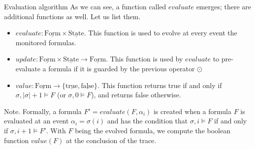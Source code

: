 \documentclass[aspectratio=169,t,xcolor=table]{beamer}
\begin{document}
\begin{frame}[allowframebreaks]{Evaluation algorithm}
    As we can see, a function called $evaluate$ emerges; there are additional functions as well. Let us list them.
    \begin{itemize}
        \item $evaluate: \underline{\text{Form}} \times \underline{\text{State}}$. This function is used to evolve at every event the monitored formulas.
        \item $update: \underline{\text{Form}} \times \underline{\text{State}} \to \underline{\text{Form}}$. This function is used by $evaluate$ to pre-evaluate a formula if it is guarded by the previous operator $\odot$
        \item $value : \underline{\text{Form}} \rightarrow \{ \underline{\text{true}}, \underline{\text{false}} \}$. This function returns true if and only if $\sigma,|\sigma|+1 \models F$ (or $\sigma,0 \models F$), and returns false otherwise.
    \end{itemize}
    \begin{block}{Note.}
        Formally, a formula $F' = evaluate(F, \alpha_i)$ is created when a formula $F$ is evaluated at an event $\alpha_i = \sigma(i)$ and has the condition that $\sigma, i \models F$ if and only if $\sigma, i+1 \models F'$. With $F$ being the evolved formula, we compute the boolean function $value(F)$ at the conclusion of the trace.
    \end{block}


\end{frame}
\end{document}
